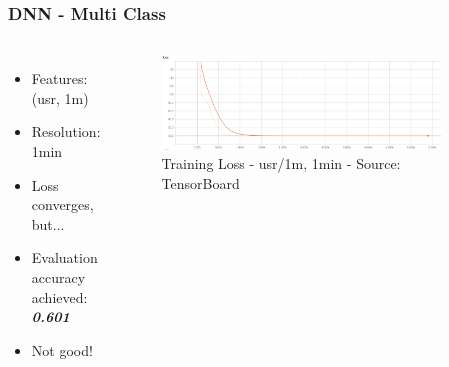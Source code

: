 \documentclass[aspectratio=169,11pt,hyperref={colorlinks=true}]{beamer}
\begin{document}
\begin{frame}
    \frametitle{DNN - Multi Class}
    \begin{columns}
        \begin{itemize}
          \item{Features: (usr, 1m)}
          \item{Resolution: 1min}
          \item{Loss converges, but...}
          \item{Evaluation accuracy achieved: \emph{\textbf{0.601}}}
          \item{Not good!}
        \end{itemize}
        \begin{figure}
          \begin{center}
            \includegraphics[width=0.9\textwidth,height=0.5\textheight]{graphs/cpu_1m-1min-node_provider_all_loss_curve.png}
              \caption{Training Loss - usr/1m, 1min - Source: TensorBoard}
          \end{center}
        \end{figure}
      \end{columns}
\end{frame}
\end{document}
